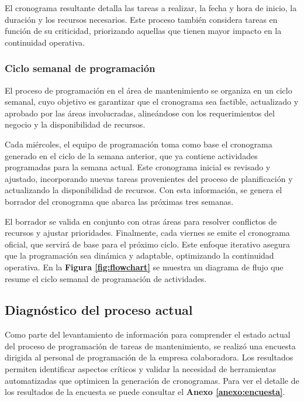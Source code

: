 \documentclass{article}
\begin{document}
El cronograma resultante detalla las tareas a realizar, la fecha y hora de inicio, la duración y los recursos necesarios. Este proceso también considera tareas en función de su criticidad, priorizando aquellas que tienen mayor impacto en la continuidad operativa.

\subsubsection{Ciclo semanal de programación}

El proceso de programación en el área de mantenimiento se organiza en un ciclo semanal, cuyo objetivo es garantizar que el cronograma sea factible, actualizado y aprobado por las áreas involucradas, alineándose con los requerimientos del negocio y la disponibilidad de recursos.

Cada miércoles, el equipo de programación toma como base el cronograma generado en el ciclo de la semana anterior, que ya contiene actividades programadas para la semana actual. Este cronograma inicial es revisado y ajustado, incorporando nuevas tareas provenientes del proceso de planificación y actualizando la disponibilidad de recursos. Con esta información, se genera el borrador del cronograma que abarca las próximas tres semanas.

El borrador se valida en conjunto con otras áreas para resolver conflictos de recursos y ajustar prioridades. Finalmente, cada viernes se emite el cronograma oficial, que servirá de base para el próximo ciclo. Este enfoque iterativo asegura que la programación sea dinámica y adaptable, optimizando la continuidad operativa. En la \textbf{Figura \ref{fig:flowchart}} se muestra un diagrama de flujo que resume el ciclo semanal de programación de actividades.


\subsection{Diagnóstico del proceso actual}

Como parte del levantamiento de información para comprender el estado actual del proceso de programación de tareas de mantenimiento, se realizó una encuesta dirigida al personal de programación de la empresa colaboradora. Los resultados permiten identificar aspectos críticos y validar la necesidad de herramientas automatizadas que optimicen la generación de cronogramas. Para ver el detalle de los resultados de la encuesta se puede consultar el \textbf{Anexo \ref{anexo:encuesta}}.
\end{document}
